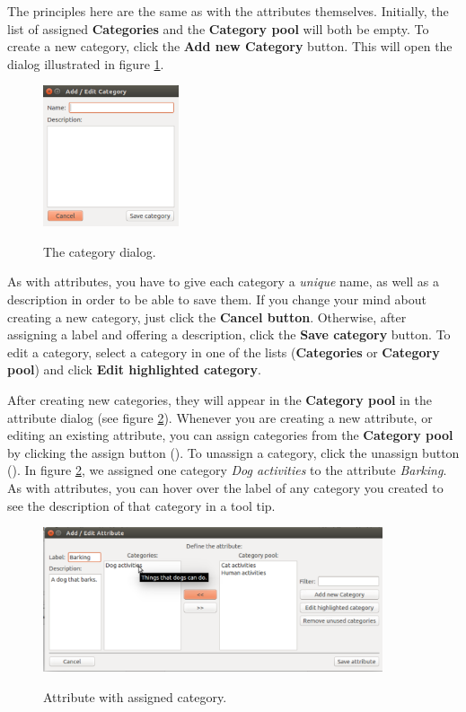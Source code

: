 \documentclass{memoir}
\begin{document}
The principles here are the same as with the attributes themselves. Initially, the list of assigned \textbf{Categories} and the \textbf{Category pool} will both be empty. To create a new category, click the \textbf{Add new Category} button. This will open the dialog illustrated in figure \ref{fig:categorydialog}.

\begin{figure}[h!]
  \centering
  \caption{The category dialog.}
  \includegraphics[width=40mm]{Screenshot_11.pdf}
  \label{fig:categorydialog}
\end{figure}

As with attributes, you have to give each category a \emph{unique} name, as well as a description in order to be able to save them. If you change your mind about creating a new category, just click the \textbf{Cancel button}. Otherwise, after assigning a label and offering a description, click the \textbf{Save category} button. To edit a category, select a category in one of the lists (\textbf{Categories} or \textbf{Category pool}) and click \textbf{Edit highlighted category}.

After creating new categories, they will appear in the \textbf{Category pool} in the attribute dialog (see figure \ref{fig:attributedialogwithcategories}). Whenever you are creating a new attribute, or editing an existing attribute, you can assign categories from the \textbf{Category pool} by clicking the assign button (\textbf{\guillemotleft}). To unassign a category, click the unassign button (\textbf{\guillemotright}). In figure \ref{fig:attributedialogwithcategories}, we assigned one category \emph{Dog activities} to the attribute \emph{Barking}. As with attributes, you can hover over the label of any category you created to see the description of that category in a tool tip. 

\begin{figure}[h!]
  \centering
  \caption{Attribute with assigned category.}
  \includegraphics[width=100mm]{Screenshot_12.pdf}
  \label{fig:attributedialogwithcategories}
\end{figure}
\end{document}
